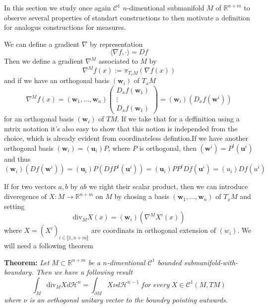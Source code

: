 In this section we study once again $\mathcal C^1$ $n$-dimentional submanifold $M$
of $\mathbb R^{n+m}$ to observe several properties of standart constructions to
then motivate a definition for analogus constructions for measures.

\vspace{2ex}
We can define a gradient $\nabla$ by representation
\[\langle \nabla f, \cdot\rangle=Df\]
Then we define a gradient $\nabla^M$ associated to $M$ by
\[\nabla^M f(x) := \pi_{T_xM}(\nabla f(x))\]
and if we have an orthogonal basis $(\mathbf w_i)$ of $T_xM$
\[\nabla^M f(x) = (\mathbf w_1,\ldots,\mathbf w_n)\left(\begin{array}{c}D_xf(\mathbf w_1)\\ \vdots\\D_xf(\mathbf w_1)\end{array}\right)=(\mathbf w_i)(D_xf(\mathbf w^i))\]
for an orthogonal basis $(\mathbf w_i)$ of $TM$. If we take that for a deffinition
using a mtrix notation it's also easy to show that this notion is independed from the choice,
which is already evident from coordinateless defintion.If  we have another
orthogonal basis $(\mathbf w_i)=(\mathbf u_i)P$, where $P$ is orthogonal, 
then $(\mathbf w^i)=P^t(\mathbf u^i)$ and thus $(\mathbf w_i)(Df(\mathbf w^i))
=(\mathbf u_i)P(DfP^t(\mathbf u^i))=(\mathbf u_i)PP^tDf(\mathbf u^i)=(u_i)Df(u^i)$

\vspace{2ex}
If for two vectors $a,b$ by $ab$ we right their scalar product, then we can
introduce diveregence of $X:M\rightarrow\mathbb R^{n+m}$ on $M$ by chosing
a basis $(\mathbf w_1,\ldots,\mathbf w_n)$ of $T_xM$ and setting
\[\text{div}_MX(x)=(\mathbf w_i)(\nabla^MX^i(x))\]
where $X=(X^i)_{i\in\llbracket1,n+m\rrbracket}$ are coordinats in orthogonal
extension of $(w_i)$. We will need a following theorem

\vspace{2ex}
\textbf{Theorem:} \textit{Let $M\subset \mathbb R^{n+m}$ be a $n$-dimentional
$\mathcal C^1$ bounded submanifold-with-boundary. Then we have a following result}
\[\int_M \text{div}_MXd\mathcal H^n=\int_{\partial M}X\nu d\mathcal H^{n-1}\;\textit{for every}\;X\in\mathcal C^1(M,TM)\]
\textit{where $\nu$ is an orthogonal unitary vector to the boundry pointing outwards.}

